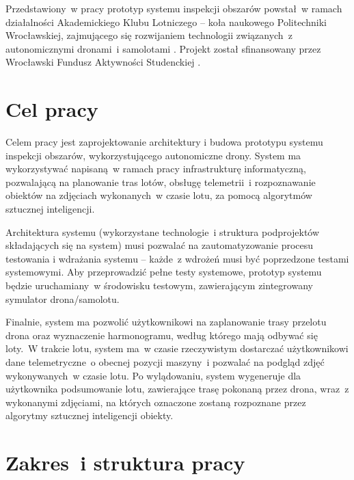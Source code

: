 Przedstawiony~w pracy prototyp systemu inspekcji obszarów powstał~w ramach działalności
Akademickiego Klubu Lotniczego -- koła naukowego Politechniki Wrocławskiej, zajmującego
się rozwijaniem technologii związanych~z autonomicznymi dronami~i samolotami
\cite{akl_home_page}. Projekt został sfinansowany przez Wrocławski Fundusz
Aktywności Studenckiej \cite{fast_webpage}.


\section{Cel pracy} \label{intro_objective}

Celem pracy jest zaprojektowanie architektury i budowa prototypu systemu inspekcji obszarów,
wykorzystującego autonomiczne drony. %
System ma wykorzystywać napisaną~w ramach pracy
infrastrukturę informatyczną, pozwalającą na planowanie tras lotów, obsługę telemetrii~i
rozpoznawanie obiektów na zdjęciach wykonanych~w czasie lotu, za pomocą algorytmów
sztucznej inteligencji. 

Architektura systemu (wykorzystane technologie~i struktura podprojektów składających
się na system) musi pozwalać na zautomatyzowanie procesu testowania i wdrażania systemu
 -- każde~z wdrożeń musi być poprzedzone testami systemowymi.
Aby przeprowadzić pełne testy systemowe, prototyp systemu będzie uruchamiany~w
środowisku testowym, zawierającym zintegrowany symulator drona/samolotu.

Finalnie, system ma pozwolić użytkownikowi na zaplanowanie trasy przelotu drona
oraz wyznaczenie harmonogramu, według którego mają odbywać się loty.~W trakcie 
lotu, system ma~w czasie rzeczywistym dostarczać użytkownikowi dane telemetryczne~o
obecnej pozycji maszyny~i pozwalać na podgląd zdjęć wykonywanych~w czasie lotu.
Po wylądowaniu, system wygeneruje dla użytkownika podsumowanie lotu, zawierające
trasę pokonaną przez drona, wraz~z wykonanymi zdjęciami, na których oznaczone zostaną
rozpoznane przez algorytmy sztucznej inteligencji obiekty.

\section{Zakres~i struktura pracy} \label{intro_scope}

